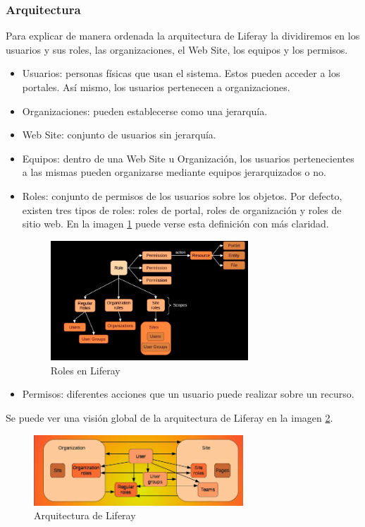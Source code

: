 \subsubsection{Arquitectura}
\par Para explicar de manera ordenada la arquitectura de Liferay la dividiremos en los usuarios y sus roles, las organizaciones, el Web Site, los equipos y los permisos.
\begin{itemize}
    \item Usuarios: personas físicas que usan el sistema. Estos pueden acceder a los portales. Así mismo, los usuarios pertenecen a organizaciones.
    \item Organizaciones: pueden establecerse como una jerarquía.
    \item Web Site: conjunto de usuarios sin jerarquía.
    \item Equipos: dentro de una Web Site u Organización, los usuarios pertenecientes a las mismas pueden organizarse mediante equipos jerarquizados o no.
    \item Roles: conjunto de permisos de los usuarios sobre los objetos. Por defecto, existen tres tipos de roles: roles de portal, roles de organización y roles de sitio web. En la imagen \ref{img:roles} puede verse esta definición con más claridad.
    \begin{figure}[H]
    \begin{center}
    \includegraphics[width=0.7\textwidth]{./img/liferay_roles.png}
    \end{center}
    \caption{Roles en Liferay}
    \label{img:roles}
    \end{figure}

    \item Permisos: diferentes acciones que un usuario puede realizar sobre un recurso.
\end{itemize}
\par Se puede ver una visión global de la arquitectura de Liferay en la imagen \ref{img:arch}.
\begin{figure}[H]
\begin{center}
\includegraphics[width=0.7\textwidth]{./img/liferay_arch.png}
\end{center}
\caption{Arquitectura de Liferay}
\label{img:arch}
\end{figure}

